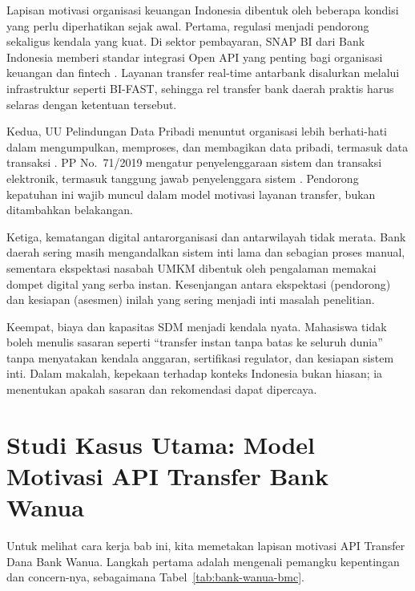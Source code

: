 Lapisan motivasi organisasi keuangan Indonesia dibentuk oleh beberapa kondisi
yang perlu diperhatikan sejak awal. Pertama, regulasi menjadi pendorong sekaligus
kendala yang kuat. Di sektor pembayaran, SNAP BI dari Bank Indonesia memberi
standar integrasi Open API yang penting bagi organisasi keuangan dan fintech
\cite{snapbi}. Layanan transfer real-time antarbank disalurkan melalui
infrastruktur seperti BI-FAST, sehingga rel transfer bank daerah praktis harus
selaras dengan ketentuan tersebut.

Kedua, UU Pelindungan Data Pribadi menuntut organisasi lebih berhati-hati dalam
mengumpulkan, memproses, dan membagikan data pribadi, termasuk data transaksi
\cite{uupdp2022}. PP No.~71/2019 mengatur penyelenggaraan sistem dan transaksi
elektronik, termasuk tanggung jawab penyelenggara sistem \cite{pp712019}.
Pendorong kepatuhan ini wajib muncul dalam model motivasi layanan transfer,
bukan ditambahkan belakangan.

Ketiga, kematangan digital antarorganisasi dan antarwilayah tidak merata. Bank
daerah sering masih mengandalkan sistem inti lama dan sebagian proses manual,
sementara ekspektasi nasabah UMKM dibentuk oleh pengalaman memakai dompet
digital yang serba instan. Kesenjangan antara ekspektasi (pendorong) dan
kesiapan (asesmen) inilah yang sering menjadi inti masalah penelitian.

Keempat, biaya dan kapasitas SDM menjadi kendala nyata. Mahasiswa tidak boleh
menulis sasaran seperti ``transfer instan tanpa batas ke seluruh dunia'' tanpa
menyatakan kendala anggaran, sertifikasi regulator, dan kesiapan sistem inti.
Dalam makalah, kepekaan terhadap konteks Indonesia bukan hiasan; ia menentukan
apakah sasaran dan rekomendasi dapat dipercaya.

\section{Studi Kasus Utama: Model Motivasi API Transfer Bank Wanua}

Untuk melihat cara kerja bab ini, kita memetakan lapisan motivasi API Transfer
Dana Bank Wanua. Langkah pertama adalah mengenali pemangku kepentingan dan
concern-nya, sebagaimana Tabel~\ref{tab:bank-wanua-bmc}.


